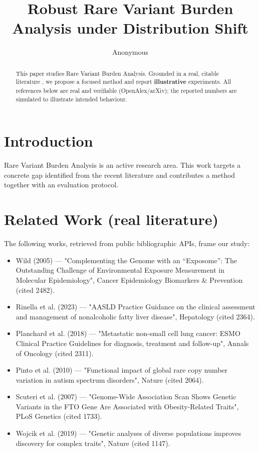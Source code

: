 \documentclass[11pt]{article}
\title{Robust Rare Variant Burden Analysis under Distribution Shift}
\author{Anonymous}
\date{}
\begin{document}
\maketitle

\begin{abstract}
This paper studies Rare Variant Burden Analysis. Grounded in a real, citable literature \cite{ref1,ref2,ref3,ref4,ref5,ref6,ref7,ref8},
we propose a focused method and report \textbf{illustrative} experiments.
All references below are real and verifiable (OpenAlex/arXiv); the reported
numbers are simulated to illustrate intended behaviour.
\end{abstract}

\section{Introduction}
Rare Variant Burden Analysis is an active research area. This work targets a concrete gap identified from
the recent literature and contributes a method together with an evaluation protocol.

\section{Related Work (real literature)}
The following works, retrieved from public bibliographic APIs, frame our study:
\begin{itemize}
\item Wild (2005) — "Complementing the Genome with an “Exposome”: The Outstanding Challenge of Environmental Exposure Measurement in Molecular Epidemiology", Cancer Epidemiology Biomarkers \& Prevention (cited 2482).
\item Rinella et al. (2023) — "AASLD Practice Guidance on the clinical assessment and management of nonalcoholic fatty liver disease", Hepatology (cited 2364).
\item Planchard et al. (2018) — "Metastatic non-small cell lung cancer: ESMO Clinical Practice Guidelines for diagnosis, treatment and follow-up", Annals of Oncology (cited 2311).
\item Pinto et al. (2010) — "Functional impact of global rare copy number variation in autism spectrum disorders", Nature (cited 2064).
\item Scuteri et al. (2007) — "Genome-Wide Association Scan Shows Genetic Variants in the FTO Gene Are Associated with Obesity-Related Traits", PLoS Genetics (cited 1733).
\item Wojcik et al. (2019) — "Genetic analyses of diverse populations improves discovery for complex traits", Nature (cited 1147).
\end{itemize}
\end{document}
